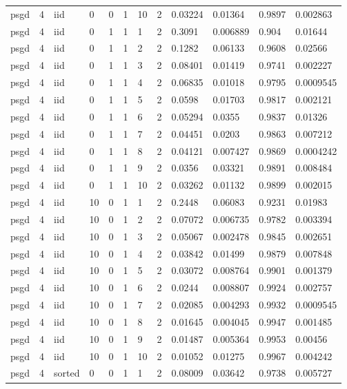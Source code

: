 \begin{tabular}{llllllllllll}
psgd & 4 & iid & 0 & 0 & 1 & 10 & 2 & 0.03224 & 0.01364 & 0.9897 & 0.002863 \\
psgd & 4 & iid & 0 & 1 & 1 & 1 & 2 & 0.3091 & 0.006889 & 0.904 & 0.01644 \\
psgd & 4 & iid & 0 & 1 & 1 & 2 & 2 & 0.1282 & 0.06133 & 0.9608 & 0.02566 \\
psgd & 4 & iid & 0 & 1 & 1 & 3 & 2 & 0.08401 & 0.01419 & 0.9741 & 0.002227 \\
psgd & 4 & iid & 0 & 1 & 1 & 4 & 2 & 0.06835 & 0.01018 & 0.9795 & 0.0009545 \\
psgd & 4 & iid & 0 & 1 & 1 & 5 & 2 & 0.0598 & 0.01703 & 0.9817 & 0.002121 \\
psgd & 4 & iid & 0 & 1 & 1 & 6 & 2 & 0.05294 & 0.0355 & 0.9837 & 0.01326 \\
psgd & 4 & iid & 0 & 1 & 1 & 7 & 2 & 0.04451 & 0.0203 & 0.9863 & 0.007212 \\
psgd & 4 & iid & 0 & 1 & 1 & 8 & 2 & 0.04121 & 0.007427 & 0.9869 & 0.0004242 \\
psgd & 4 & iid & 0 & 1 & 1 & 9 & 2 & 0.0356 & 0.03321 & 0.9891 & 0.008484 \\
psgd & 4 & iid & 0 & 1 & 1 & 10 & 2 & 0.03262 & 0.01132 & 0.9899 & 0.002015 \\
psgd & 4 & iid & 10 & 0 & 1 & 1 & 2 & 0.2448 & 0.06083 & 0.9231 & 0.01983 \\
psgd & 4 & iid & 10 & 0 & 1 & 2 & 2 & 0.07072 & 0.006735 & 0.9782 & 0.003394 \\
psgd & 4 & iid & 10 & 0 & 1 & 3 & 2 & 0.05067 & 0.002478 & 0.9845 & 0.002651 \\
psgd & 4 & iid & 10 & 0 & 1 & 4 & 2 & 0.03842 & 0.01499 & 0.9879 & 0.007848 \\
psgd & 4 & iid & 10 & 0 & 1 & 5 & 2 & 0.03072 & 0.008764 & 0.9901 & 0.001379 \\
psgd & 4 & iid & 10 & 0 & 1 & 6 & 2 & 0.0244 & 0.008807 & 0.9924 & 0.002757 \\
psgd & 4 & iid & 10 & 0 & 1 & 7 & 2 & 0.02085 & 0.004293 & 0.9932 & 0.0009545 \\
psgd & 4 & iid & 10 & 0 & 1 & 8 & 2 & 0.01645 & 0.004045 & 0.9947 & 0.001485 \\
psgd & 4 & iid & 10 & 0 & 1 & 9 & 2 & 0.01487 & 0.005364 & 0.9953 & 0.00456 \\
psgd & 4 & iid & 10 & 0 & 1 & 10 & 2 & 0.01052 & 0.01275 & 0.9967 & 0.004242 \\
psgd & 4 & sorted & 0 & 0 & 1 & 1 & 2 & 0.08009 & 0.03642 & 0.9738 & 0.005727 \\

\end{tabular}
